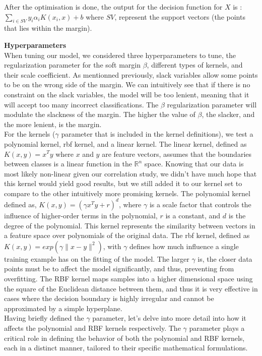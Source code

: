 \documentclass[twocolumn]{article}
\newcommand{\R}{\mathbb{R}}
\begin{document}
After the optimisation is done, the output for the decision function for $X$ is :\(\displaystyle \sum_{i\in SV} y_i\alpha_i K(x_i, x) + b\)
where $SV$, represent the support vectors (the points that lies within the margin).

\textbf{Hyperparameters}\\
When tuning our model, we considered three hyperparameters to tune, the regularization parameter for the soft margin $\beta$, different types of kernels, and their scale coefficient. As mentionned previously, slack variables allow some points to be on the wrong side of the margin. We can intuitively see that if there is no constraint on the slack variables, the model will be too lenient, meaning that it will accept too many incorrect classifications. The $\beta$ regularization parameter will modulate the slackness of the margin. The higher the value of $\beta$, the slacker, and the more lenient, is the margin. \\
For the kernels ($\gamma$ parameter that is included in the kernel definitions), we test a polynomial kernel, rbf kernel, and a linear kernel. The linear kernel, defined as $K(x, y) = x^T y$ where $x$ and $y$ are feature vectors, assumes that the boundaries between classes is a linear function in the $\R^n$ space. Knowing that our data is most likely non-linear given our correlation study, we didn't have much hope that this kernel would yield good results, but we still added it to our kernel set to compare to the other intuitively more promising kernels. The polynomial kernel defined as, $K(x, y) = (\gamma x^T y + r )^d$, where $\gamma$ is a scale factor that controls the influence of higher-order terms in the polynomial, $r$ is a constant, and $d$ is the degree of the polynomial. This kernel represents the similarity between vectors in a feature space over polynomials of the original data. The rbf kernel, defined as $K(x, y) = exp(\gamma \| x - y \|^2)$, with $\gamma$ defines how much influence a single training example has on the fitting of the model. The larger $\gamma$ is, the closer data points must be to affect the model significantly, and thus, preventing from overfitting. The RBF kernel maps samples into a higher dimensional space using the square of the Euclidean distance between them, and thus it is very effective in cases where the decision boundary is highly irregular and cannot be approximated by a simple hyperplane. \\
Having briefly defined the $\gamma$ parameter, let's delve into more detail into how it affects the polynomial and RBF kernels respectively. The $\gamma$ parameter plays a critical role in defining the behavior of both the polynomial and RBF kernels, each in a distinct manner, tailored to their specific mathematical formulations.
\end{document}
